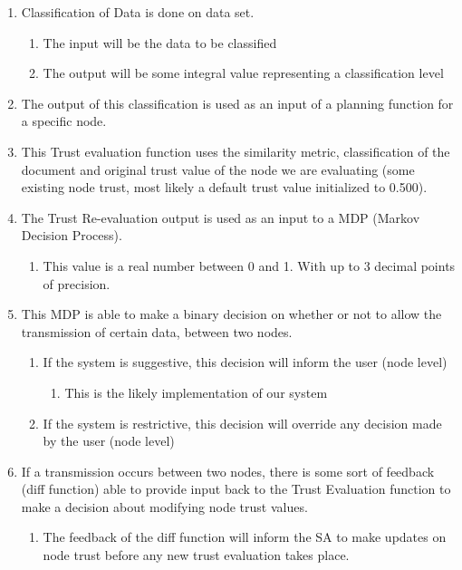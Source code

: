 \begin{enumerate}
    \item Classification of Data is done on data set.
        \begin{enumerate}
            \item The input will be the data to be classified
            \item The output will be some integral value representing a classification level
        \end{enumerate}
    \item The output of this classification is used as an input of a planning function for a specific node.
    \item This Trust evaluation function uses the similarity metric, classification of the document and original trust value of the node we are evaluating (some existing node trust, most likely a default trust value initialized to 0.500).
    \item The Trust Re-evaluation output is used as an input to a MDP (Markov Decision Process). 
        \begin{enumerate}
            \item This value is a real number between 0 and 1. With up to 3 decimal points of precision.
        \end{enumerate}
    \item This MDP is able to make a binary decision on whether or not to allow the transmission of certain data, between two nodes. 
        \begin{enumerate}
            \item If the system is suggestive, this decision will inform the user (node level)
                \begin{enumerate}
                    \item This is the likely implementation of our system
                \end{enumerate}
            \item If the system is restrictive, this decision will override any decision made by the user (node level)
        \end{enumerate}
    \item If a transmission occurs between two nodes, there is some sort of feedback (diff function) able to provide input back to the Trust Evaluation function to make a decision about modifying node trust values.
        \begin{enumerate}
            \item The feedback of the diff function will inform the SA to make updates on node trust before any new trust evaluation takes place. 
        \end{enumerate}
\end{enumerate}

